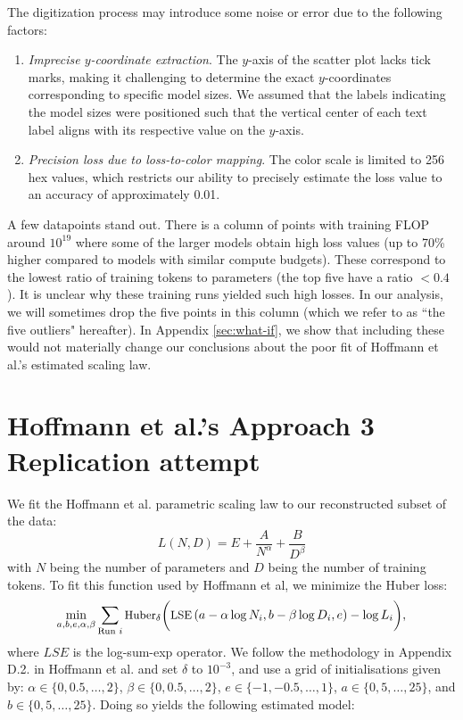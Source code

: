 \documentclass[twocolumn]{article}
\begin{document}
The digitization process may introduce some noise or error due to the following factors:

\begin{enumerate}
\item \textit{Imprecise $y$-coordinate extraction}. The $y$-axis of the scatter plot lacks tick marks, making it challenging to determine the exact $y$-coordinates corresponding to specific model sizes. We assumed that the labels indicating the model sizes were positioned such that the vertical center of each text label aligns with its respective value on the $y$-axis.
\item \textit{Precision loss due to loss-to-color mapping}. The color scale is limited to 256 hex values, which restricts our ability to precisely estimate the loss value to an accuracy of approximately 0.01.
\end{enumerate}

A few datapoints stand out. There is a column of points with training FLOP around $10^{19}$ where some of the larger models obtain high loss values (up to 70\% higher compared to models with similar compute budgets). These correspond to the lowest ratio of training tokens to parameters (the top five have a ratio $<0.4$). It is unclear why these training runs yielded such high losses. In our analysis, we will sometimes drop the five points in this column (which we refer to as ``the five outliers" hereafter). In Appendix \ref{sec:what-if}, we show that including these would not materially change our conclusions about the poor fit of Hoffmann et al.'s estimated scaling law.

\section{Hoffmann et al.'s Approach 3 Replication attempt}

We fit the Hoffmann et al. parametric scaling law to our reconstructed subset of the data:
\begin{equation}
    L(N, D) = E + \frac{A}{N^{\alpha}} + \frac{B}{D^{\beta}}
\end{equation}
with $N$ being the number of parameters and $D$ being the number of training tokens. To fit this function used by Hoffmann et al, we minimize the Huber loss:
\begin{equation}
\label{eq:huber-loss}
\small
\min_{a,b,e,\alpha,\beta} \sum_{\text{Run } i} \text{Huber}_\delta \bigg(
\text{LSE}\left( a - \alpha \log N_i, b - \beta \log D_i, e \right) - \log L_i
\bigg),
\end{equation}
where $LSE$ is the log-sum-exp operator.
We follow the methodology in Appendix D.2. in Hoffmann et al. and set $\delta$  to $10^{-3}$, and use a grid of initialisations given by: \(\alpha \in \{0, 0.5, \ldots, 2\}\), \(\beta \in \{0, 0.5, \ldots, 2\}\), \(e \in \{-1, -0.5, \ldots, 1\}\), \(a \in \{0, 5, \ldots, 25\}\), and \(b \in \{0, 5, \ldots, 25\}\). Doing so yields the following estimated model:
\end{document}
